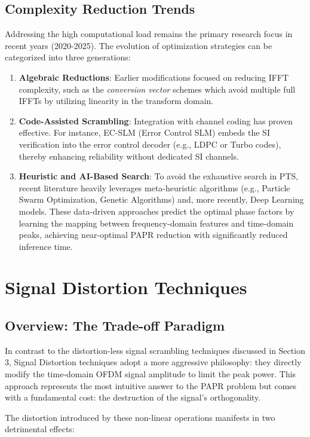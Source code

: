 \documentclass[12pt, a4paper, onecolumn]{article}
\begin{document}
\subsection{Complexity Reduction Trends}
Addressing the high computational load remains the primary research focus in recent years (2020-2025). The evolution of optimization strategies can be categorized into three generations:

\begin{enumerate}
    \item \textbf{Algebraic Reductions}: Earlier modifications focused on reducing IFFT complexity, such as the \textit{conversion vector} schemes \cite{ref7} which avoid multiple full IFFTs by utilizing linearity in the transform domain.
    \item \textbf{Code-Assisted Scrambling}: Integration with channel coding has proven effective. For instance, EC-SLM (Error Control SLM) \cite{ref8} embeds the SI verification into the error control decoder (e.g., LDPC or Turbo codes), thereby enhancing reliability without dedicated SI channels.
    \item \textbf{Heuristic and AI-Based Search}: To avoid the exhaustive search in PTS, recent literature heavily leverages meta-heuristic algorithms (e.g., Particle Swarm Optimization, Genetic Algorithms) and, more recently, Deep Learning models. These data-driven approaches predict the optimal phase factors by learning the mapping between frequency-domain features and time-domain peaks, achieving near-optimal PAPR reduction with significantly reduced inference time.
\end{enumerate}

\section{Signal Distortion Techniques}

\subsection{Overview: The Trade-off Paradigm}
In contrast to the distortion-less signal scrambling techniques discussed in Section 3, Signal Distortion techniques adopt a more aggressive philosophy: they directly modify the time-domain OFDM signal amplitude to limit the peak power. This approach represents the most intuitive answer to the PAPR problem but comes with a fundamental cost: the destruction of the signal's orthogonality.

The distortion introduced by these non-linear operations manifests in two detrimental effects:
\end{document}
